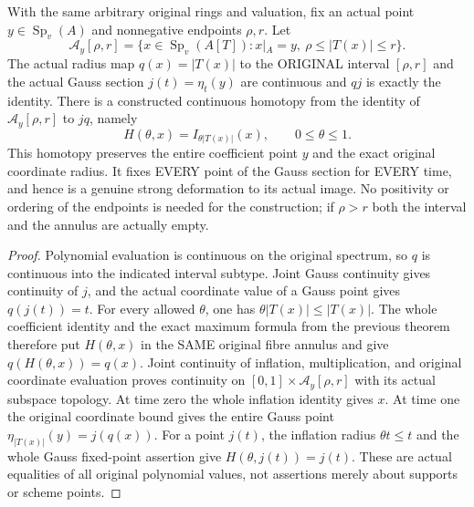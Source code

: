 \begin{theorem}
\label{analytic:actual-fibre-annulus-gauss-deformation}

With the same arbitrary original rings and valuation, fix an actual point
$y\in\operatorname{Sp}_v(A)$ and nonnegative endpoints $\rho,r$. Let
\[
 \mathcal A_y[\rho,r]=\{x\in\operatorname{Sp}_v(A[T]):
 x|_A=y,\ \rho\leq |T(x)|\leq r\}.
\]
The actual radius map $q(x)=|T(x)|$ to the ORIGINAL interval $[\rho,r]$
and the actual Gauss section $j(t)=\eta_t(y)$ are continuous and $qj$ is
exactly the identity. There is a constructed continuous homotopy from the
identity of $\mathcal A_y[\rho,r]$ to $jq$, namely
\[
 H(\theta,x)=I_{\theta |T(x)|}(x),\qquad 0\leq\theta\leq1.
\]
This homotopy preserves the entire coefficient point $y$ and the exact
original coordinate radius. It fixes EVERY point of the Gauss section for
EVERY time, and hence is a genuine strong deformation to its actual image.
No positivity or ordering of the endpoints is needed for the construction;
if $\rho>r$ both the interval and the annulus are actually empty.
\end{theorem}
\begin{proof}
Polynomial evaluation is continuous on the original spectrum, so $q$ is
continuous into the indicated interval subtype. Joint Gauss continuity gives
continuity of $j$, and the actual coordinate value of a Gauss point gives
$q(j(t))=t$. For every allowed $\theta$, one has
$\theta|T(x)|\leq |T(x)|$. The whole coefficient identity and the exact
maximum formula from the previous theorem therefore put $H(\theta,x)$ in
the SAME original fibre annulus and give $q(H(\theta,x))=q(x)$.
Joint continuity of inflation, multiplication, and original coordinate
evaluation proves continuity on $[0,1]\times\mathcal A_y[\rho,r]$ with its
actual subspace topology. At time zero the whole inflation identity gives
$x$. At time one the original coordinate bound gives the entire Gauss point
$\eta_{|T(x)|}(y)=j(q(x))$. For a point $j(t)$, the inflation radius
$\theta t\leq t$ and the whole Gauss fixed-point assertion give
$H(\theta,j(t))=j(t)$. These are actual equalities of all original polynomial
values, not assertions merely about supports or scheme points.
\end{proof}
